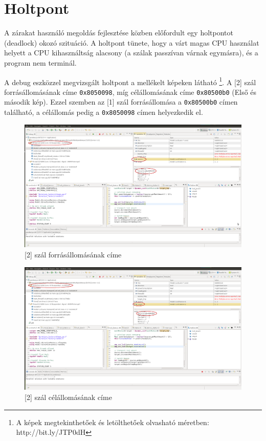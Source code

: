 \documentclass[a4paper,10pt]{article}
\begin{document}
	\section{Holtpont}
A zárakat használó megoldás fejlesztése közben előfordult egy holtpontot (deadlock) okozó szituáció. A holtpont tünete, hogy a várt magas CPU használat helyett a CPU kihasználtság alacsony (a szálak passzívan várnak egymásra), és a program nem terminál.


A debug eszközzel megvizsgált holtpont a mellékelt képeken látható \footnote{A képek megtekinthetőek és letölthetőek olvasható méretben: http://bit.ly/JTP0dH}. A [2] szál forrásállomásának címe \texttt{0x8050098}, míg célállomásának címe \texttt{0x80500b0} (Első és második kép). Ezzel szemben az [1] szál forrásállomása a \texttt{0x80500b0} címen található, a célállomás pedig a \texttt{0x8050098} címen helyezkedik el.

	\begin{figure}[h]
		\begin{center}
			\includegraphics[scale=0.23]{01.png}
			\caption{[2] szál forrásállomásának címe}
		\end{center}
	\end{figure}
	
	\begin{figure}[h]
		\begin{center}
			\includegraphics[scale=0.23]{02.png}
			\caption{[2] szál célállomásának címe}
		\end{center}
	\end{figure}
	
\end{document}
